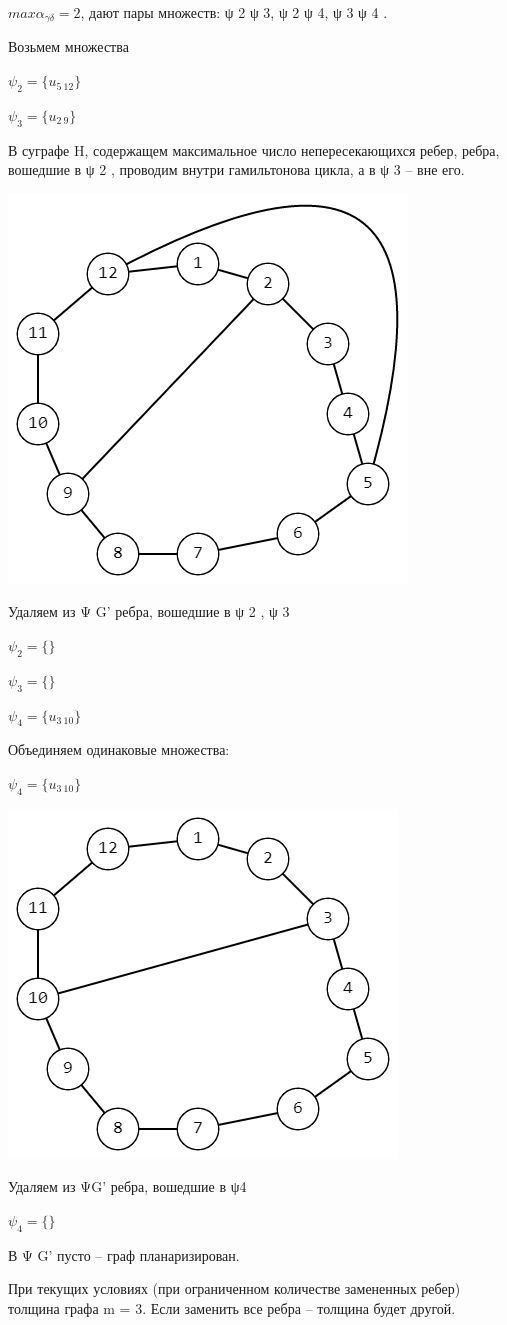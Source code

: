 \documentclass{article}
\begin{document}
$max α_{γδ} = 2$, дают пары множеств: ψ 2 ψ 3, ψ 2 ψ 4, ψ 3 ψ 4 .

Возьмем множества

$\psi_{2} = \{u_{5\ 12}\}$

$\psi_{3} = \{u_{2\ 9}\}$

В суграфе H, содержащем максимальное число непересекающихся ребер,
ребра, вошедшие в ψ 2 , проводим внутри гамильтонова цикла, а в ψ 3 – вне
его.

\begin{center}
  \includegraphics[scale=0.5]{graph2.png}
\end{center}

Удаляем из Ψ G’ ребра, вошедшие в ψ 2 , ψ 3

$\psi_{2} = \{\}$

$\psi_{3} = \{\}$

$\psi_{4} = \{u_{3\ 10}\}$

Объединяем одинаковые множества:

$\psi_{4} = \{u_{3\ 10}\}$

\begin{center}
  \includegraphics[scale=0.5]{graph3.png}
\end{center}

Удаляем из ΨG’ ребра, вошедшие в ψ4

$\psi_{4} = \{{}\}$


В Ψ G’ пусто – граф планаризирован.

При текущих условиях (при ограниченном количестве замененных ребер)
толщина графа m = 3. Если заменить все ребра – толщина будет другой.
\end{document}
